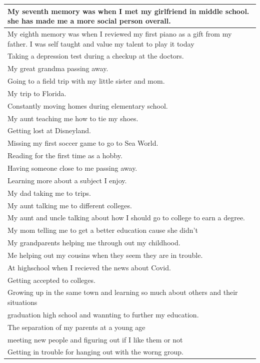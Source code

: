 \documentclass[
  .7em,
  letterpaper,
  DIV=11,
  numbers=noendperiod]{scrartcl}
\begin{document}
\begin{table}
\begin{tabular}{l}
\hline
My seventh memory was when I met my girlfriend in middle school. she has made me a more social person overall.\\
\hline
My eighth memory was when I reviewed my first piano as a gift from my father. I was self taught and value my talent to play it today\\
\hline
Taking a depression test during a checkup at the doctors.\\
\hline
My great grandma passing away.\\
\hline
Going to a field trip with my little sister and mom.\\
\hline
My trip to Florida.\\
\hline
Constantly moving homes during elementary school.\\
\hline
My aunt teaching me how to tie my shoes.\\
\hline
Getting lost at Disneyland.\\
\hline
Missing my first soccer game to go to Sea World.\\
\hline
Reading for the first time as a hobby.\\
\hline
Having someone close to me passing away.\\
\hline
Learning more about a subject I enjoy.\\
\hline
My dad taking me to trips.\\
\hline
My aunt talking me to different colleges.\\
\hline
My aunt and uncle talking about how I should go to college to earn a degree.\\
\hline
My mom telling me to get a better education cause she didn't\\
\hline
My grandparents helping me through out my childhood.\\
\hline
Me helping out my cousins when they seem they are in trouble.\\
\hline
At highschool when I recieved the news about Covid.\\
\hline
Getting accepted to colleges.\\
\hline
Growing up in the same town and learning so much about others and their situations\\
\hline
graduation high school and wannting to further my education.\\
\hline
The separation of my parents at a young age\\
\hline
meeting new people and figuring out if I like them or not\\
\hline
Getting in trouble for hanging out with the worng group.\\

\end{tabular}
\end{table}
\end{document}
